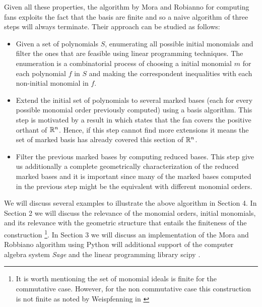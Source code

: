 Given all these properties, the algorithm by Mora and Robianno \cite{MORA1988183}
for computing \grob fans exploits the fact that the \grob basis are finite and so
a naive algorithm of three steps will always terminate. Their approach can be
studied as follows:

\begin{itemize}
\item[1.] Given a set of polynomials $S$, enumerating all possible initial monomials
  and filter the ones that are feasible using linear programming techniques.
  The enumeration is a combinatorial
  process of choosing a initial monomial $m$ for each polynomial $f$ in $S$ and making the
  correspondent inequalities with each non-initial monomial in $f$. 
\item[2.] Extend the initial set of polynomials to several marked \grob bases
  (each for every possible monomial order previously computed)
  using a \grob basis algorithm. This step is motivated by a result in
  \cite{Cox:2014} which states that the \grob fan covers the positive orthant
  of $\mathbb{R}^n$. Hence, if this step cannot find more extensions it means
  the set of marked \grob basis has already covered this section of $\mathbb{R}^n$.
\item[3.] Filter the previous marked \grob bases by computing reduced \grob
  bases. This step give us additionally a complete geometrically characterization
  of the reduced marked \grob bases and it is important since many of the marked
  \grob bases computed in the previous step might be the equivalent with different
  monomial orders. 
\end{itemize}

We will discuss several examples to illustrate the above algorithm in Section 4. In Section
2 we will discuss the relevance of the monomial orders, initial monomials, and its relevance
with the geometric structure that entails the finiteness of the construction \footnote{It is worth
  mentioning the set of monomial ideals is finite for the commutative case. However, for the non
  commutative case this construction is not finite as noted by Weispfenning in
  \cite{10.1007/3-540-51082-6_96}}. In Section 3 we will discuss an implementation of the
Mora and Robbiano algorithm using Python will additional support of the computer algebra system \emph{Sage}
\cite{SageMultivariatePolynomials} and the linear programming library scipy \cite{linprog}.


